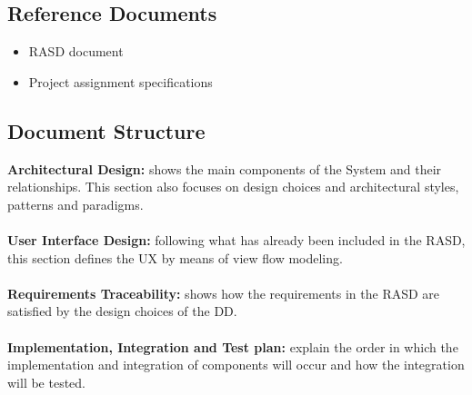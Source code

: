 %

\subsection{Reference Documents}
    \begin{itemize}
        \item RASD document
        \item Project assignment specifications
    \end{itemize}

\subsection{Document
Structure}

\textbf{Architectural Design:} shows the main components of the System and their relationships. This section also focuses on design choices and architectural styles, patterns and paradigms.\\\\
\textbf{User Interface Design:} following what has already been included in the RASD, this section defines the UX by means of view flow modeling.\\\\
\textbf{Requirements Traceability:} shows how the requirements in the RASD are satisfied by the design choices of the DD.\\\\
\textbf{Implementation, Integration and Test plan:} explain the order in which the implementation and integration of components will occur and how the integration will be tested.\\